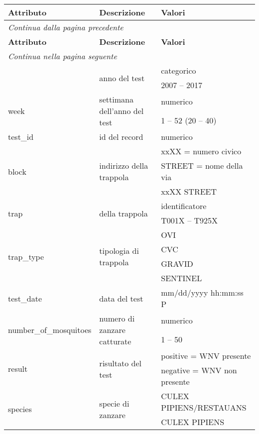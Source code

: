 \begin{longtable}{lll}
	\toprule
	\textbf{Attributo} \quad & \textbf{Descrizione} & \textbf{Valori} \\
	\midrule
	\endfirsthead
	\multicolumn{3}{l}{\footnotesize\itshape Continua dalla pagina precedente} \\
	\toprule
	\textbf{Attributo} \quad & \textbf{Descrizione} & \textbf{Valori} \\			
	\endhead
	\multicolumn{3}{l}{\footnotesize\itshape Continua nella pagina 
		seguente} \\
	\endfoot
	\endlastfoot
	
	\multirow{2}{*}{season\_year} & \multirow{2}{*}{anno del test} &  categorico \\
	& &{2007} -- {2017}       	\\ \hline
	\multirow{2}{*}{week}					&\multirow{2}{*}{settimana dell'anno del test}  & numerico    \\ 
	& & {1} -- {52} ({20} -- {40})\\\hline
	test\_id			& id del record &  numerico        	\\\hline 
	\multirow{3}{*}{block}	& \multirow{3}{*}{indirizzo della trappola} & xxXX 
	= numero civico \\
	& & STREET = nome della via	\\
	& & xxXX STREET \\ \hline
	\multirow{2}{*}{trap}	&\multirow{2}{*}{ della trappola} &  identificatore        	\\ 
	&& T001X -- T925X\\\hline
	\multirow{4}{*}{trap\_type}				& \multirow{4}{*}{tipologia di trappola} &     OVI\\
	&& CVC\\
	&& GRAVID\\
	&& SENTINEL\\\hline
	{test\_date}	&{data del test}   &   mm/dd/yyyy hh:mm:ss P \\\hline
	\multirow{2}{*}{number\_of\_mosquitoes}	& \multirow{2}{*}{numero di zanzare catturate} &  numerico        	\\ 
	& & {1} -- {50} \\ \hline
	\multirow{2}{*}{result}	& \multirow{2}{*}{risultato del test}   &  positive = WNV presente \\
	& & negative = WNV non presente  	\\ \hline
	\multirow{8}{*}{species}	& \multirow{8}{*}{specie di zanzare}	 & CULEX PIPIENS/RESTAUANS \\
	& & CULEX PIPIENS \\

\end{longtable}
